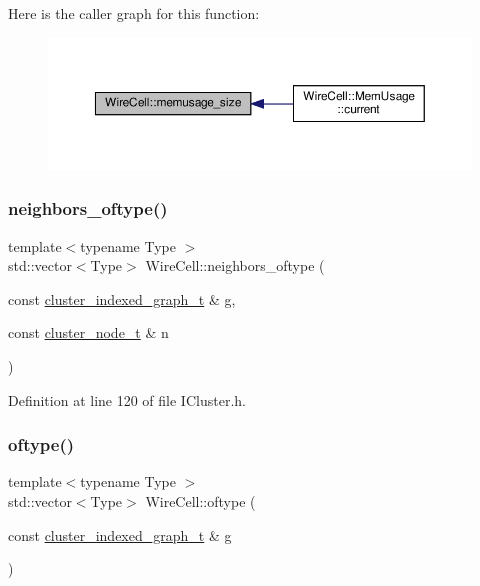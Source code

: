 Here is the caller graph for this function\+:
\nopagebreak
\begin{figure}[H]
\begin{center}
\leavevmode
\includegraphics[width=350pt]{namespace_wire_cell_a079570140982516787676ec882e0f297_icgraph}
\end{center}
\end{figure}
\mbox{\label{namespace_wire_cell_a11c40bd5197fa73c633ce987e1d284e4}} 
\subsubsection{\texorpdfstring{neighbors\+\_\+oftype()}{neighbors\_oftype()}}
{\footnotesize\ttfamily template$<$typename Type $>$ \\
std\+::vector$<$Type$>$ Wire\+Cell\+::neighbors\+\_\+oftype (\begin{DoxyParamCaption}\item[{const \hyperlink{namespace_wire_cell_a81d03e7272d04b607afc90bd3f7a9499}{cluster\+\_\+indexed\+\_\+graph\+\_\+t} \&}]{g,  }\item[{const \hyperlink{struct_wire_cell_1_1cluster__node__t}{cluster\+\_\+node\+\_\+t} \&}]{n }\end{DoxyParamCaption})}



Definition at line 120 of file I\+Cluster.\+h.

\mbox{\label{namespace_wire_cell_ae4db8903c9e13b5563b27842413aa9ff}} 
\subsubsection{\texorpdfstring{oftype()}{oftype()}}
{\footnotesize\ttfamily template$<$typename Type $>$ \\
std\+::vector$<$Type$>$ Wire\+Cell\+::oftype (\begin{DoxyParamCaption}\item[{const \hyperlink{namespace_wire_cell_a81d03e7272d04b607afc90bd3f7a9499}{cluster\+\_\+indexed\+\_\+graph\+\_\+t} \&}]{g }\end{DoxyParamCaption})}



